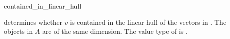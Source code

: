 \ccHtmlNoRefLinks
\begin{ccRefFunction}{contained_in_linear_hull}
\ccHtmlNoLinks

 {determines whether $v$ is contained
  in the linear hull of the vectors in \ccc{A = tuple [first,last)}.
  \ccPrecond The objects in $A$ are of the same dimension.
  \ccRequire The value type of  is
  .}

\end{ccRefFunction}

